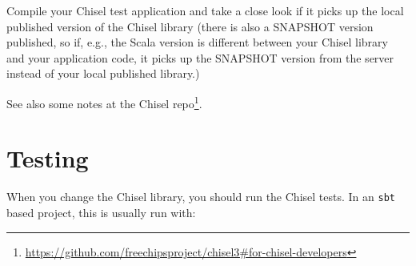 \documentclass[%
    10pt,
    headinclude, footexclude,
    openright, %
    notitlepage,
    cleardoubleempty,
    headsepline,
    pointlessnumbers,
    bibtotoc, idxtotoc,
    ]{scrbook}
\newcommand{\code}[1]{{\small{\texttt{#1}}}}
\newcommand{\myref}[2]{\href{#1}{#2}}
\renewcommand{\myref}[2]{{#2}{\footnote{\url{#1}}}}
\begin{document}
Compile your Chisel test application and take a close look if it picks up the local published
version of the Chisel library (there is also a SNAPSHOT version published, so if, e.g.,
the Scala version is different between your Chisel library and your application code,
it picks up the SNAPSHOT version from the server instead of your local published
library.)

See also \myref{https://github.com/freechipsproject/chisel3\#for-chisel-developers}{some notes
at the Chisel repo}.

\section{Testing}

When you change the Chisel library, you should run the Chisel tests.
In an \code{sbt} based project, this is usually run with:
\end{document}
